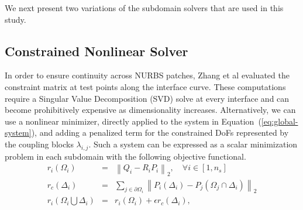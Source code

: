 \documentclass[conference]{IEEEtran}
\newcommand{\eqt}[1]{Equation~(\ref{#1})}
\begin{document}
We next present two variations of the subdomain solvers that are used in this study. 

\subsection{Constrained Nonlinear Solver}

In order to ensure continuity across NURBS patches, Zhang et al  \cite{zhang-nurbs-continuity} evaluated the constraint matrix at test points along the interface curve. These computations require a Singular Value Decomposition (SVD) solve at every interface and can become prohibitively expensive as dimensionality increases. Alternatively, we can use a nonlinear minimizer, directly applied to the system in \eqt{eq:global-system}, and adding a penalized term for the constrained DoFs represented by the coupling blocks $\lambda_{i,j}$. Such a system can be expressed as a scalar minimization problem in each subdomain with the following objective functional.
%
\begin{eqnarray}
r_i(\Omega_i) &=& \left\lVert Q_i - R_i P_i \right\rVert_2, \quad \forall i \in [1, n_s] \nonumber \\
r_c(\Delta_{i})    &=& \sum_{j \in \partial \Omega_i} \left\lVert P_i(\Delta_i) - P_{j}(\Omega_{j} \cap \Delta_{i} )  \right\rVert_2 \nonumber \\ 
r_i(\Omega_i \bigcup \Delta_{i}) &=&  r_i(\Omega_i) + \epsilon r_c(\Delta_{i}), 
\label{eq:nonlinear-residuals}
\end{eqnarray}
\end{document}
